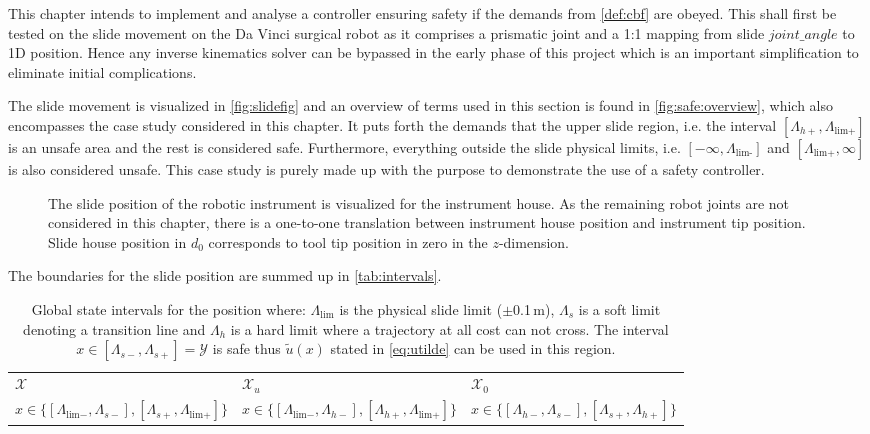 This chapter intends to implement and analyse a controller ensuring safety if the demands from \autoref{def:cbf} %
are obeyed. This shall first be tested on the slide movement on the Da Vinci surgical robot as it comprises a prismatic joint and a 1:1 mapping from slide $joint\_angle$ to 1D position. Hence any inverse kinematics solver can be bypassed in the early phase of this project which is an important simplification to eliminate initial complications.

The slide movement is visualized in \autoref{fig:slidefig} and an overview of terms used in this section is found in \autoref{fig:safe:overview}, which also encompasses  the case study considered in this chapter. It puts forth the demands that the upper slide region, i.e. the interval $[\Lambda_{h+},\Lambda_\text{lim+}]$ is an unsafe area and the rest is considered safe. Furthermore, everything outside the slide physical limits, i.e. $[-\infty,\Lambda_\text{lim-}]$ and $[\Lambda_\text{lim+},\infty]$ is also considered unsafe. This case study is purely made up with the purpose to demonstrate the use of a safety controller.
\begin{figure}[H]
\centering
{}%
%
\caption{The slide position of the robotic instrument is visualized for the instrument house. As the remaining robot joints are not considered in this chapter, there is a one-to-one translation between instrument house position and instrument tip position. Slide house position in $d_0$ corresponds to tool tip position in zero in the $z$-dimension.}
\label{fig:slide}
\end{figure}
The boundaries for the slide position are summed up in \autoref{tab:intervals}.
\begin{table}[H]
	\begin{tabularx}{\textwidth}{X X X }
\rowcolor{HeaderBlue} 
$\mathcal{X}$ & $\mathcal{X}_u$  & $\mathcal{X}_0$ \\
$x \in \{[\Lambda_{\text{lim}-},\Lambda_{s-}],[\Lambda_{s+},\Lambda_{\text{lim}+}]\}$  & $x \in \{[\Lambda_{\text{lim}-},\Lambda_{h-}],[\Lambda_{h+},\Lambda_{\text{lim}+}]\} $ & $x \in \{[\Lambda_{h-},\Lambda_{s-}],[\Lambda_{s+},\Lambda_{h+}]\}$  \\
\end{tabularx}
\caption{Global state intervals for the position where: $\Lambda_\text{lim}$ is the physical slide limit ($\pm$0.1\,m), $\Lambda_s$ is a soft limit denoting a transition line and $\Lambda_h$ is a hard limit where a trajectory at all cost can not cross. The interval $x \in [\Lambda_{s-},\Lambda_{s+}] = \mathcal{Y}$ is safe thus $\tilde{u}(x)$ stated in \autoref{eq:utilde} can be used in this region.}
\label{tab:intervals}
\end{table}
